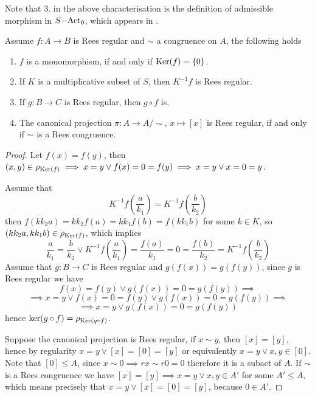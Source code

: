 \begin{remark}
    Note that $3.$ in the above characterisation is the definition of admissible morphism in $S\mathrm{-Act}_0$, 
    which appears in \cite{Flores15}.
\end{remark}
\begin{proposition}\label{regPropChar}
    Assume $f:A \to B$ is Rees regular and $\sim$ a congruence on $A$, the following holds
    \begin{enumerate}
        \item $f$ is a monomorphism, if and only if $\mathrm{Ker}(f) = \{0\}$.
        \item If $K$ is a multiplicative subset of $S$, then $K^{-1}f$ is Rees regular.
        \item If $g: B \to C$ is Rees regular, then $g\circ f$ is.
        \item The canonical projection $\pi : A \to A/\sim$, $x\mapsto [x]$ is Rees regular, if and only if 
        $\sim$ is a Rees congruence.
    \end{enumerate}
\end{proposition}
\begin{proof}[Proof]
    Let $f(x)=f(y)$, then $(x,y)\in\rho_{\mathrm{Ker}(f)} \implies x=y \lor f(x)=0=f(y) \implies x=y \lor x=0=y$.\par 
    Assume that 
    \[
        K^{-1}f\left(\frac{a}{k_1}\right) = K^{-1}f\left(\frac{b}{k_2}\right)
    \]
    then $f(kk_2a)=kk_2f(a) = kk_1f(b)=f(kk_1b)$ for some $k\in K$, so $(kk_2 a,kk_1b)\in\rho_{\mathrm{Ker}(f)}$, which implies 
    \[
        \frac{a}{k_1}=\frac{b}{k_2} \lor K^{-1}f\left(\frac{a}{k_1}\right)= \frac{f(a)}{k_1} = 0 = \frac{f(b)}{k_2} = K^{-1}f\left(\frac{b}{k_2}\right) 
    \]
    Assume that $g: B\to C$ is Rees regular and $g(f(x))=g(f(y))$, since $g$ is Rees regular we have 
    \[
        f(x)=f(y) \lor g(f(x))=0=g(f(y)) \implies 
        \]
        \[\implies x=y \lor f(x)=0=f(y) \lor g(f(x))=0=g(f(y)) \implies
    \]
    \[
        \implies x=y \lor g(f(x))=0=g(f(y))
    \]
    hence $\mathrm{ker}(g\circ f) = \rho_{\mathrm{Ker}(g\circ f)}$.\par
    Suppose the canonical projection is Rees regular, if $x\sim y$, then $[x]=[y]$, hence by regularity 
    $x=y \lor [x]=[0]=[y]$ or equivalently $x=y\lor x,y\in [0]$. Note that $[0]\leq A$, since $x\sim 0 \implies rx\sim r0 = 0$ 
    therefore it is a subact of $A$. If $\sim$ is a Rees congruence we have $[x]=[y] \implies x=y \lor x,y\in A'$ for some $A'\leq A$,
    which means precisely that $x=y \lor [x]=[0]=[y]$, because $0\in A'$. 
\end{proof}
